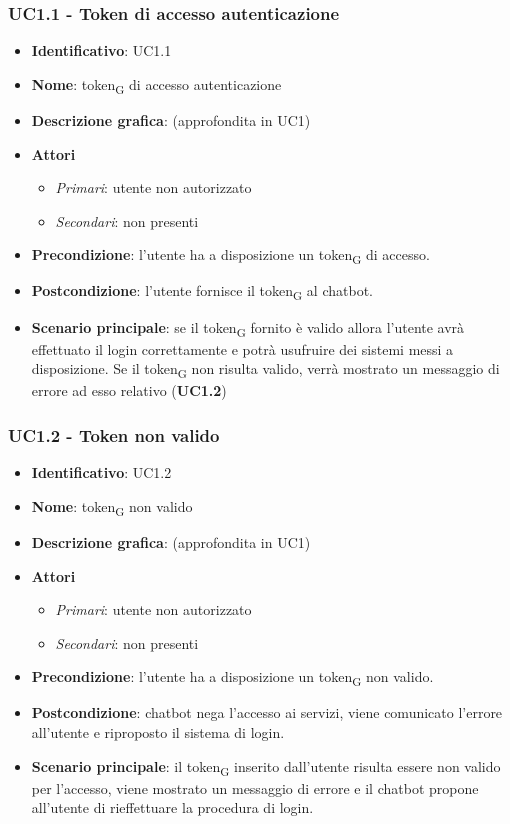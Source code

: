 \subsubsection{UC1.1 - Token di accesso autenticazione}
\begin{itemize}
    \item \textbf{Identificativo}: UC1.1
    \item \textbf{Nome}: token\textsubscript{G} di accesso autenticazione
    \item \textbf{Descrizione grafica}: (approfondita in UC1)
    \item \textbf{Attori}
 \begin{itemize} 
    \item \textit{Primari}: utente non autorizzato
    \item \textit{Secondari}: non presenti
 \end{itemize}
 \item \textbf{Precondizione}: l'utente ha a disposizione un token\textsubscript{G} di accesso.
 \item \textbf{Postcondizione}: l'utente fornisce il token\textsubscript{G} al chatbot.
 \item \textbf{Scenario principale}: se il token\textsubscript{G} fornito è valido allora l'utente avrà effettuato il login correttamente e potrà usufruire dei sistemi messi a disposizione. Se il token\textsubscript{G} non risulta valido, verrà mostrato un messaggio di errore ad esso relativo (\textbf{UC1.2})
\end{itemize}

\subsubsection{UC1.2 - Token non valido}
\begin{itemize}
    \item \textbf{Identificativo}: UC1.2
    \item \textbf{Nome}: token\textsubscript{G} non valido
    \item \textbf{Descrizione grafica}: (approfondita in UC1)
    \item \textbf{Attori}
 \begin{itemize} 
    \item \textit{Primari}: utente non autorizzato 
    \item \textit{Secondari}: non presenti
 \end{itemize}
 \item \textbf{Precondizione}: l'utente ha a disposizione un token\textsubscript{G} non valido.
 \item \textbf{Postcondizione}: chatbot nega l'accesso ai servizi, viene comunicato l'errore all'utente e riproposto il sistema di login.
 \item \textbf{Scenario principale}: il token\textsubscript{G} inserito dall'utente risulta essere non valido per l'accesso, viene mostrato un messaggio di errore e il chatbot propone all'utente di rieffettuare la procedura di login.
\end{itemize}
\newpage